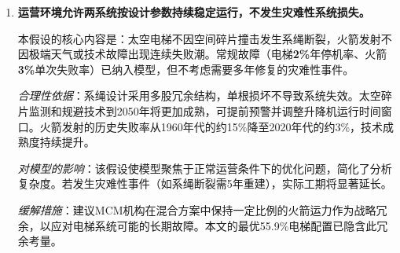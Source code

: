 \begin{enumerate}
    \textit{缓解措施}：模型采用保守的中间估计值（1500美元/公斤），并在敏感性分析中检验了成本上浮50\%和下降30\%的情景，确保结论的稳健性。
    
    \item \textbf{运营环境允许两系统按设计参数持续稳定运行，不发生灾难性系统损失。}
    
    本假设的核心内容是：太空电梯不因空间碎片撞击发生系绳断裂，火箭发射不因极端天气或技术故障出现连续失败潮。常规故障（电梯\textbf{2\%}年停机率、火箭\textbf{3\%}单次失败率）已纳入模型，但不考虑需要多年修复的灾难性事件。
    
    \textit{合理性依据}：系绳设计采用多股冗余结构，单根损坏不导致系统失效。太空碎片监测和规避技术到2050年将更加成熟，可提前预警并调整升降机运行时间窗口。火箭发射的历史失败率从1960年代的约15\%降至2020年代的约3\%，技术成熟度持续提升。
    
    \textit{对模型的影响}：该假设使模型聚焦于正常运营条件下的优化问题，简化了分析复杂度。若发生灾难性事件（如系绳断裂需5年重建），实际工期将显著延长。
    
    \textit{缓解措施}：建议MCM机构在混合方案中保持一定比例的火箭运力作为战略冗余，以应对电梯系统可能的长期故障。本文的最优55.9\%电梯配置已隐含此冗余考量。
\end{enumerate}
